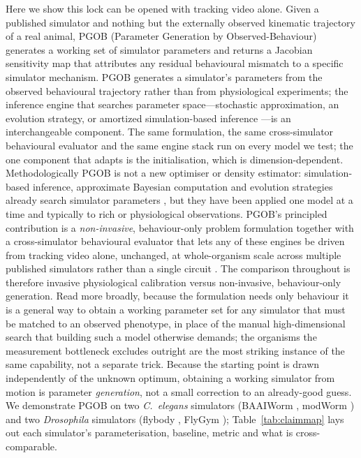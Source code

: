 \documentclass[11pt]{article}
\begin{document}
Here we show this lock can be opened with tracking video alone. Given a published simulator and nothing but the externally observed kinematic trajectory of a real animal, PGOB (Parameter Generation by Observed-Behaviour) generates a working set of simulator parameters and returns a Jacobian sensitivity map that attributes any residual behavioural mismatch to a specific simulator mechanism. PGOB generates a simulator's parameters from the observed behavioural trajectory rather than from physiological experiments; the inference engine that searches parameter space---stochastic approximation, an evolution strategy, or amortized simulation-based inference \citep{cranmer2020frontier}---is an interchangeable component. The same formulation, the same cross-simulator behavioural evaluator and the same engine stack run on every model we test; the one component that adapts is the initialisation, which is dimension-dependent. Methodologically PGOB is not a new optimiser or density estimator: simulation-based inference, approximate Bayesian computation and evolution strategies already search simulator parameters \citep{goncalves2020training,tejero2020sbi,hansen2001completely}, but they have been applied one model at a time and typically to rich or physiological observations. PGOB's principled contribution is a \emph{non-invasive}, behaviour-only problem formulation together with a cross-simulator behavioural evaluator that lets any of these engines be driven from tracking video alone, unchanged, at whole-organism scale across multiple published simulators rather than a single circuit \citep{izquierdo2013connecting}. The comparison throughout is therefore invasive physiological calibration versus non-invasive, behaviour-only generation. Read more broadly, because the formulation needs only behaviour it is a general way to obtain a working parameter set for any simulator that must be matched to an observed phenotype, in place of the manual high-dimensional search that building such a model otherwise demands; the organisms the measurement bottleneck excludes outright are the most striking instance of the same capability, not a separate trick. Because the starting point is drawn independently of the unknown optimum, obtaining a working simulator from motion is parameter \emph{generation}, not a small correction to an already-good guess. We demonstrate PGOB on two \emph{C.~elegans} simulators (BAAIWorm \citep{wang2025baaiworm}, modWorm \citep{shlizerman2025modworm}) and two \emph{Drosophila} simulators (flybody \citep{vaxenburg2025flybody}, FlyGym \citep{wangchen2024neuromechfly}); Table~\ref{tab:claimmap} lays out each simulator's parameterisation, baseline, metric and what is cross-comparable.
\end{document}
